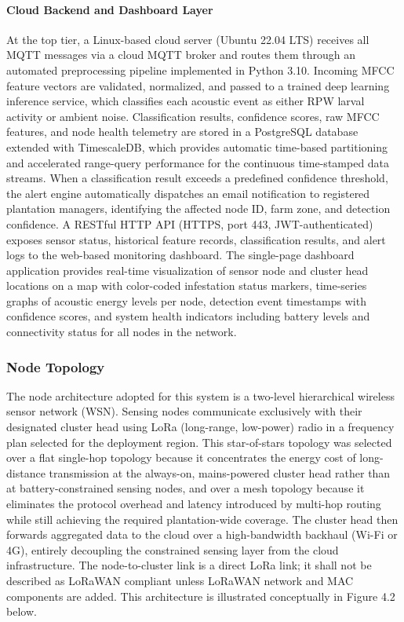 \documentclass[12pt,a4paper,oneside]{memoir}
\newcommand{\newrevision}[1]{\textcolor{green!45!black}{#1}}
\begin{document}
\paragraph{Cloud Backend and Dashboard Layer}

At the top tier, a Linux-based cloud server (Ubuntu 22.04 LTS) receives all MQTT messages via a cloud MQTT broker and routes them through an automated preprocessing pipeline implemented in Python 3.10. Incoming MFCC feature vectors are validated, normalized, and passed to a trained deep learning inference service, which classifies each acoustic event as either RPW larval activity or ambient noise. Classification results, confidence scores, raw MFCC features, and node health telemetry are stored in a PostgreSQL database extended with TimescaleDB, which provides automatic time-based partitioning and accelerated range-query performance for the continuous time-stamped data streams. When a classification result exceeds a predefined confidence threshold, the alert engine automatically dispatches an email notification to registered plantation managers, identifying the affected node ID, farm zone, and detection confidence. A RESTful HTTP API (HTTPS, port 443, JWT-authenticated) exposes sensor status, historical feature records, classification results, and alert logs to the web-based monitoring dashboard. The single-page dashboard application provides real-time visualization of sensor node and cluster head locations on a map with color-coded infestation status markers, time-series graphs of acoustic energy levels per node, detection event timestamps with confidence scores, and system health indicators including battery levels and connectivity status for all nodes in the network.

\subsubsection{Node Topology}

The node architecture adopted for this system is a two-level hierarchical wireless sensor network (WSN). Sensing nodes communicate exclusively with their designated cluster head using LoRa (long-range, low-power) radio in a frequency plan selected for the deployment region. This star-of-stars topology was selected over a flat single-hop topology because it concentrates the energy cost of long-distance transmission at the always-on, mains-powered cluster head rather than at battery-constrained sensing nodes, and over a mesh topology because it eliminates the protocol overhead and latency introduced by multi-hop routing while still achieving the required plantation-wide coverage. The cluster head then forwards aggregated data to the cloud over a high-bandwidth backhaul (Wi-Fi or 4G), entirely decoupling the constrained sensing layer from the cloud infrastructure. \newrevision{The node-to-cluster link is a direct LoRa link; it shall not be described as LoRaWAN compliant unless LoRaWAN network and MAC components are added.} This architecture is illustrated conceptually in Figure 4.2 below.
\end{document}
